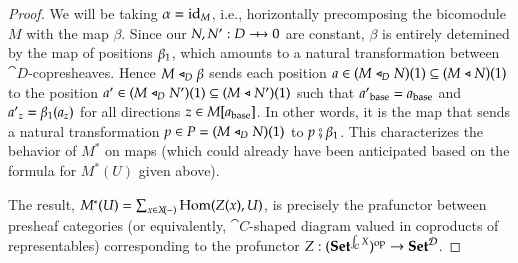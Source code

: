 \documentclass{amsart}
\begin{document}
\begin{proof}
  We will be taking $\alpha = \mathrm{id}_M$, i.e., horizontally precomposing
  the bicomodule $M$ with the map $\beta$. Since our $N, N': D \bim 0$
  are constant, $\beta$ is entirely detemined by the map of positions
  ${\beta}_1$, which amounts to a natural transformation between
  $\cat{D}$-copresheaves. Hence $M \mathrel{\triangleleft}_D \beta$ sends each position
  $a \in (M \mathrel{\triangleleft}_D N)(1) \subseteq (M \mathrel{\triangleleft} N)(1)$ to the
  position $a' \in (M \mathrel{\triangleleft}_D N')(1) \subseteq (M \mathrel{\triangleleft} N')(1)$
  such that ${a'}_{\mathrm{base}} = a_{\mathrm{base}}$ and
  ${a'}_z = {\beta}_1(a_z)$ for all directions
  $z \in M[a_{\mathrm{base}}]$. In other words, it is the map that sends a
  natural transformation $p \in P = (M \mathrel{\triangleleft}_D N)(1)$ to
  $p \fatsemi {\beta}_1$. This characterizes the behavior of
  $M^*$ on maps (which could already have been anticipated based on
  the formula for $M^*(U)$ given above).

  The result, $M^*(U) = \sum_{x \in X\!(-)} \operatorname{Hom}(Z(x),U)$, is
  precisely the prafunctor between presheaf categories (or
  equivalently, $\cat{C}$-shaped diagram valued in coproducts of
  representables) corresponding to the profunctor
  $Z: ({\normalfont\mathbf{Set}}^{\int_{\mathcal{C}}X})^{\mathrm{op}} \to {\normalfont\mathbf{Set}}^{\mathcal{D}}$.

  \iffalse
  The $\cat{C}$-copresheaf map $M^*(!_U)$, where $!_U: U \to 1$,
  assigns each $p: Z_x \to U$ in $M^*(U)$ the index $x \in X$ of its
  domain $Z_x$, equipping $M^*U$ with the structure of a
  $\int_{\cat{C}}X$-copresheaf. This is the canonical lift of the
  functor $M^*: \Set^{\cat{D}} \to \Set^{\cat{C}}$ to a functor
  $\slicelift{M^*}: \Set^{\cat{D}} \to \Set^{\cat{C}}/M^*(1) =
  \Set^{\cat{C}}/X \cong \Set^{\int_{\cat{C}}X}$.

  Now we may ask, is $\slicelift{M^*}$ the functor we expected? Carrying
  through the correspondence between profunctors and prafunctors, we
  expect it to be right adjoint to the cocontinuous extension of
  $Z: (\int_{\cat{C}}X)^\op \to \Set^{\cat{D}}$ to the free
  cocompletion of its domain,
  $\cocoextend{Z}: \Set^{\int_{\cat{C}}X} \to
  \Set^{\cat{D}}$. Fortunately, $U \mapsto \Hom(Z(-),U)$ is precisely
  the formula for the right adjoint of the cocontinuous extension of a
  (co)presheaf-valued functor $Z$ to the cocompletion of its domain.
  \fi
\end{proof}
\end{document}
